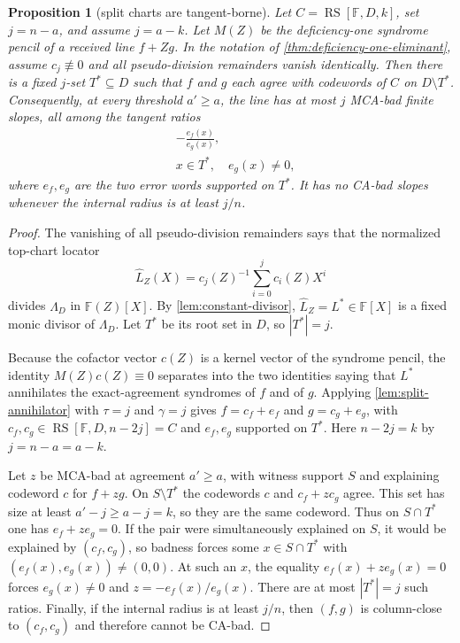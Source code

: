 \documentclass[a4paper,11pt]{amsart}
\newtheorem{proposition}[proposition]{Proposition}
\theoremstyle{remark}
\newcommand{\F}{\mathbb F}
\newcommand{\RS}{\operatorname{RS}}
\begin{document}
\begin{proposition}[split charts are tangent-borne]\label{prop:split-chart-tangent}
Let \(C=\RS[\F,D,k]\), set \(j=n-a\), and assume \(j=a-k\).  Let \(M(Z)\) be the deficiency-one syndrome pencil of a received line \(f+Zg\).  In the notation of \cref{thm:deficiency-one-eliminant}, assume \(c_j\not\equiv0\) and all pseudo-division remainders vanish identically.  Then there is a fixed \(j\)-set \(T^*\subseteq D\) such that \(f\) and \(g\) each agree with codewords of \(C\) on \(D\setminus T^*\).  Consequently, at every threshold \(a'\ge a\), the line has at most \(j\) MCA-bad finite slopes, all among the tangent ratios
\[
        \begin{aligned}
        &-\frac{e_f(x)}{e_g(x)},\\
        &x\in T^*,\quad e_g(x)\ne0,
        \end{aligned}
\]
where \(e_f,e_g\) are the two error words supported on \(T^*\).  It has no CA-bad slopes whenever the internal radius is at least \(j/n\).
\end{proposition}

\begin{proof}
The vanishing of all pseudo-division remainders says that the normalized top-chart locator
\[
        \widehat L_Z(X)=c_j(Z)^{-1}\sum_{i=0}^j c_i(Z)X^i
\]
divides \(\Lambda_D\) in \(\F(Z)[X]\).  By \cref{lem:constant-divisor}, \(\widehat L_Z=L^*\in\F[X]\) is a fixed monic divisor of \(\Lambda_D\).  Let \(T^*\) be its root set in \(D\), so \(|T^*|=j\).

Because the cofactor vector \(c(Z)\) is a kernel vector of the syndrome pencil, the identity \(M(Z)c(Z)\equiv0\) separates into the two identities saying that \(L^*\) annihilates the exact-agreement syndromes of \(f\) and of \(g\).  Applying \cref{lem:split-annihilator} with \(\tau=j\) and \(\gamma=j\) gives \(f=c_f+e_f\) and \(g=c_g+e_g\), with \(c_f,c_g\in\RS[\F,D,n-2j]=C\) and \(e_f,e_g\) supported on \(T^*\).  Here \(n-2j=k\) by \(j=n-a=a-k\).

Let \(z\) be MCA-bad at agreement \(a'\ge a\), with witness support \(S\) and explaining codeword \(c\) for \(f+zg\).  On \(S\setminus T^*\) the codewords \(c\) and \(c_f+zc_g\) agree.  This set has size at least \(a'-j\ge a-j=k\), so they are the same codeword.  Thus on \(S\cap T^*\) one has \(e_f+ze_g=0\).  If the pair were simultaneously explained on \(S\), it would be explained by \((c_f,c_g)\), so badness forces some \(x\in S\cap T^*\) with \((e_f(x),e_g(x))\ne(0,0)\).  At such an \(x\), the equality \(e_f(x)+ze_g(x)=0\) forces \(e_g(x)\ne0\) and \(z=-e_f(x)/e_g(x)\).  There are at most \(|T^*|=j\) such ratios.  Finally, if the internal radius is at least \(j/n\), then \((f,g)\) is column-close to \((c_f,c_g)\) and therefore cannot be CA-bad.
\end{proof}
\end{document}
